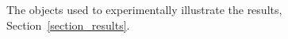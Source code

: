 \documentclass[journal]{IEEEtran}
\begin{document}

\begin{figure}[t]
\centering
{}
\caption{The objects used to experimentally illustrate the results, Section~\ref{section_results}.}
\label{fig:object}
\end{figure}
\end{document}
